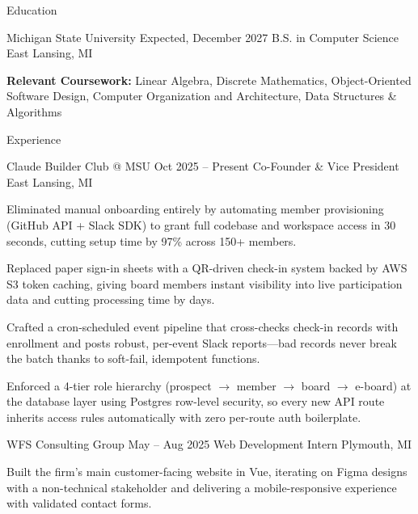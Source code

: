 \documentclass[
	11pt
]{../../resume}
\begin{document}
	\begin{rSection}{E}{ducation}
		\begin{rSectionEntry}
			{Michigan State University}
			{Expected, December 2027}
			{B.S. in Computer Science}
			{}
			{East Lansing, MI}

			\item \textbf{Relevant Coursework:} Linear Algebra, Discrete Mathematics, Object-Oriented Software Design, Computer Organization and Architecture, Data Structures \& Algorithms
		\end{rSectionEntry}
	\end{rSection}

	\begin{rSection}{E}{xperience}
		\begin{rSectionEntry}
			{Claude Builder Club @ MSU}
			{Oct 2025 -- Present}
			{Co-Founder \& Vice President}
			{}
			{East Lansing, MI}

			\item Eliminated manual onboarding entirely by automating member provisioning (GitHub API + Slack SDK) to grant full codebase and workspace access in 30 seconds, cutting setup time by 97\% across 150+ members.
			\item Replaced paper sign-in sheets with a QR-driven check-in system backed by AWS S3 token caching, giving board members instant visibility into live participation data and cutting processing time by days.
			\item Crafted a cron-scheduled event pipeline that cross-checks check-in records with enrollment and posts robust, per-event Slack reports—bad records never break the batch thanks to soft-fail, idempotent functions.
			\item Enforced a 4-tier role hierarchy (prospect $\rightarrow$ member $\rightarrow$ board $\rightarrow$ e-board) at the database layer using Postgres row-level security, so every new API route inherits access rules automatically with zero per-route auth boilerplate.
		\end{rSectionEntry}

		\begin{rSectionEntry}
			{WFS Consulting Group}
			{May -- Aug 2025}
			{Web Development Intern}
			{}
			{Plymouth, MI}

			\item Built the firm's main customer-facing website in Vue, iterating on Figma designs with a non-technical stakeholder and delivering a mobile-responsive experience with validated contact forms.
		\end{rSectionEntry}
	\end{rSection}
\end{document}
